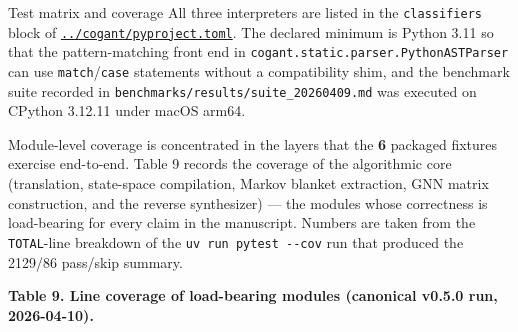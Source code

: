 \documentclass[
  ignorenonframetext,
]{beamer}
\begin{document}
\begin{frame}[fragile]{Test matrix and coverage}
All three interpreters are listed in the \texttt{classifiers} block of
\href{../cogant/pyproject.toml}{\texttt{../cogant/pyproject.toml}}. The
declared minimum is Python 3.11 so that the pattern-matching front end
in \texttt{cogant.static.parser.PythonASTParser} can use
\texttt{match}/\texttt{case} statements without a compatibility shim,
and the benchmark suite recorded in
\texttt{benchmarks/results/suite\_20260409.md} was executed on CPython
3.12.11 under macOS arm64.

Module-level coverage is concentrated in the layers that the \textbf{6}
packaged fixtures exercise end-to-end. Table 9 records the coverage of
the algorithmic core (translation, state-space compilation, Markov
blanket extraction, GNN matrix construction, and the reverse
synthesizer) --- the modules whose correctness is load-bearing for every
claim in the manuscript. Numbers are taken from the \texttt{TOTAL}-line
breakdown of the \texttt{uv\ run\ pytest\ -\/-cov} run that produced the
2129/86 pass/skip summary.

\textbf{Table 9. Line coverage of load-bearing modules (canonical v0.5.0
run, 2026-04-10).}


\end{frame}
\end{document}
